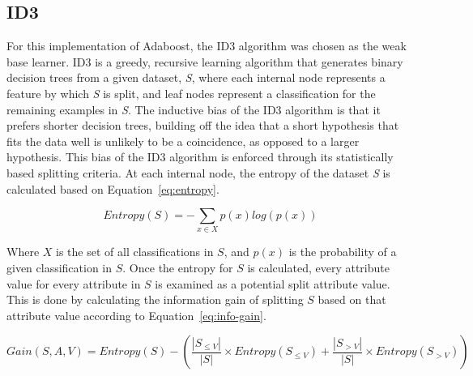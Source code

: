 \documentclass[a4paper]{article}
\begin{document}
\subsection{ID3}
For this implementation of Adaboost, the ID3 algorithm was chosen as the weak base learner. ID3 is a greedy, recursive learning algorithm that generates binary decision trees from a given dataset, \textit{S}, where each internal node represents a feature by which \textit{S} is split, and leaf nodes represent a classification for the remaining examples in \textit{S}. The inductive bias of the ID3 algorithm is that it prefers shorter decision trees, building off the idea that a short hypothesis that fits the data well is unlikely to be a coincidence, as opposed to a larger hypothesis. This bias of the ID3 algorithm is enforced through its statistically based splitting criteria. At each internal node, the entropy of the dataset \textit{S} is calculated based on Equation~\ref{eq:entropy}.

\begin{equation}
    \label{eq:entropy}
    Entropy(S) = -\sum_{x \in X} p(x)log(p(x))
\end{equation}

Where $X$ is the set of all classifications in $S$, and $p(x)$ is the probability of a given classification in $S$. Once the entropy for $S$ is calculated, every attribute value for every attribute in $S$ is examined as a potential split attribute value. This is done by calculating the information gain of splitting $S$ based on that attribute value according to Equation~\ref{eq:info-gain}.

\begin{equation}
    \label{eq:info-gain}
    Gain(S, A, V) = Entropy(S) - \left(\frac{|S_{\le V}|}{|S|}\times Entropy(S_{\le V}) + \frac{|S_{> V}|}{|S|}\times Entropy(S_{> V}) \right)
\end{equation}
\end{document}
